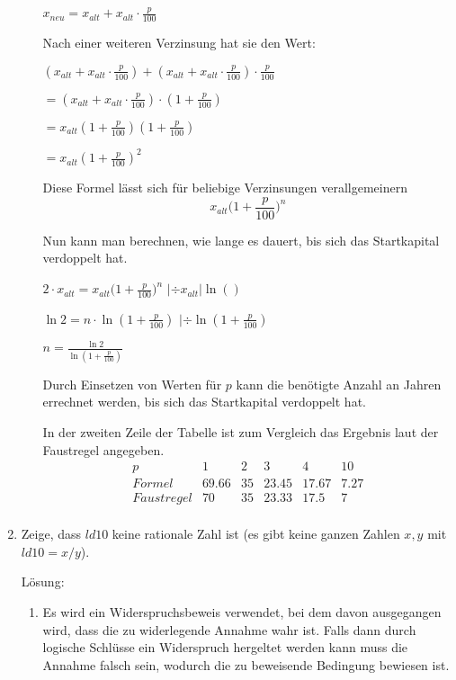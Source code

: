 \documentclass[main.tex]{subfiles}
\begin{document}
\begin{enumerate}
\begin{enumerate}
		            \( x_{neu} = x_{alt} + x_{alt} \cdot \frac{p}{100}  \)

		            Nach einer weiteren Verzinsung hat sie den Wert:

		            \(  ( x_{alt} + x_{alt} \cdot \frac{p}{100} ) + ( x_{alt} + x_{alt} \cdot \frac{p}{100} ) \cdot \frac{p}{100}\)

		            \( =  ( x_{alt} + x_{alt} \cdot \frac{p}{100} ) \cdot ( 1+ \frac{p}{100}) \)

		            \( = x_{alt} (1 + \frac{p}{100}) (1 + \frac{p}{100}) \)

		            \( = x_{alt} (1+ \frac{p}{100})^2 \)

		            Diese Formel lässt sich für beliebige Verzinsungen verallgemeinern
		            \[ x_{alt} \Big(1 + \frac{p}{100} \Big)^n \]

		            Nun kann man berechnen, wie lange es dauert, bis sich das Startkapital verdoppelt hat.

		            \( 2 \cdot x_{alt} = x_{alt} \Big(1 + \frac{p}{100} \Big)^n \) \( | \div x_{alt} | \ln() \)

		            \( \ln 2 = n \cdot \ln(1 + \frac{p}{100}) \) \( | \div \ln (1 +\frac{p}{100}) \)

		            \( n = \frac{\ln 2}{\ln (1 + \frac{p}{100})} \)

		            Durch Einsetzen von Werten für \( p \) kann die benötigte Anzahl an Jahren errechnet werden,
		            bis sich das Startkapital verdoppelt hat.

		            In der zweiten Zeile der Tabelle ist zum Vergleich das
		            Ergebnis laut der Faustregel angegeben.
		            \[
			            \begin{array}{c|ccccc}
				            p          & 1     & 2  & 3     & 4     & 10   \\
				            \hline
				            Formel     & 69.66 & 35 & 23.45 & 17.67 & 7.27 \\
				            Faustregel & 70    & 35 & 23.33 & 17.5  & 7    \\
			            \end{array}
		            \]
	      \end{enumerate}
	\item Zeige, dass \( ld 10 \) keine rationale Zahl ist
	      (es gibt keine ganzen Zahlen \( x , y \) mit \( ld 10 = x / y \)).

	      Lösung:
	      \begin{enumerate}
		      \item Es wird ein Widerspruchsbeweis verwendet, bei dem davon ausgegangen wird,
		            dass die zu widerlegende Annahme wahr ist. Falls dann durch logische Schlüsse ein
		            Widerspruch hergeltet werden kann muss die Annahme falsch sein, wodurch die zu
				beweisende Bedingung bewiesen ist.
				

\end{enumerate}
\end{enumerate}
\end{document}
